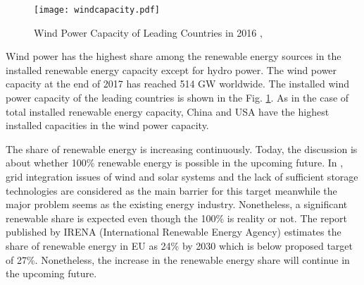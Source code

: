 \begin{figure}[h!]
	\centering
	\texttt{[image: windcapacity.pdf]}
	\caption{Wind Power Capacity of Leading Countries in 2016 \cite{InternationalRenewableEnergyAgencyIRENA2018},\cite{InternationalRenewableEnergyAgency2017}}
	\label{windcap}
\end{figure}
Wind power has the highest share among the renewable energy sources in the installed renewable energy capacity except for hydro power. The wind power capacity at the end of 2017 has reached 514 GW worldwide\cite{InternationalRenewableEnergyAgencyIRENA2018}. The installed wind power capacity of the leading countries is shown in the Fig. \ref{windcap}. As in the case of total installed renewable energy capacity, China and USA have the highest installed capacities in the wind power capacity. \par
The share of renewable energy is increasing continuously. Today, the discussion is about whether 100\% renewable energy is possible in the upcoming future. In \cite{REN212017d}, grid integration issues of wind and solar systems and the lack of sufficient storage technologies are considered as the main barrier for this target meanwhile the major problem seems as the existing energy industry. Nonetheless, a significant renewable share is expected even though the 100\% is reality or not. The report published by IRENA (International Renewable Energy Agency) estimates the share of renewable energy in EU as 24\% by 2030 which is below proposed target of 27\%\cite{IRENA2014}. Nonetheless, the increase in the renewable energy share will continue in the upcoming future. \par
 
